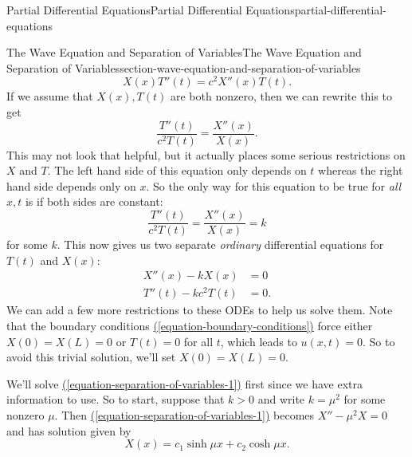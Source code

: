 \documentclass[oneside,10pt,]{book}
\numberwithin{equation}{section}
\newcommand{\amp}{&}
\begin{document}
\begin{chapterptx}{Partial Differential Equations}{}{Partial Differential Equations}{}{}{partial-differential-equations}
\begin{sectionptx}{The Wave Equation and Separation of Variables}{}{The Wave Equation and Separation of Variables}{}{}{section-wave-equation-and-separation-of-variables}
%
\begin{equation*}
X(x)T''(t) = c^{2}X''(x)T(t).
\end{equation*}
\hypertarget{p-654}{}%
If we assume that \(X(x),T(t)\) are both nonzero, then we can rewrite this to get%
\begin{equation*}
\frac{T''(t)}{c^{2}T(t)} = \frac{X''(x)}{X(x)}.
\end{equation*}
This may not look that helpful, but it actually places some serious restrictions on \(X\) and \(T\). The left hand side of this equation only depends on \(t\) whereas the right hand side depends only on \(x\). So the only way for this equation to be true for \emph{all} \(x,t\) is if both sides are constant:%
\begin{equation*}
\frac{T''(t)}{c^{2}T(t)} = \frac{X''(x)}{X(x)} = k
\end{equation*}
for some \(k\). This now gives us two separate \emph{ordinary} differential equations for \(T(t)\) and \(X(x)\):%
%
\begin{align}
X''(x) - kX(x) \amp = 0 \label{equation-separation-of-variables-1}\\
T''(t) - kc^{2}T(t) \amp = 0\text{.}\label{equation-separation-of-variables-2}
\end{align}
\hypertarget{p-655}{}%
We can add a few more restrictions to these ODEs to help us solve them. Note that the boundary conditions \hyperref[equation-boundary-conditions]{(\ref{equation-boundary-conditions})} force either \(X(0) = X(L) = 0\) or \(T(t) = 0\) for all \(t\), which leads to \(u(x,t) = 0\). So to avoid this trivial solution, we'll set \(X(0) = X(L) = 0\).%
\par
\hypertarget{p-656}{}%
We'll solve \hyperref[equation-separation-of-variables-1]{(\ref{equation-separation-of-variables-1})} first since we have extra information to use. So to start, suppose that \(k>0\) and write \(k = \mu^{2}\) for some nonzero \(\mu\). Then \hyperref[equation-separation-of-variables-1]{(\ref{equation-separation-of-variables-1})} becomes \(X''-\mu^{2}X = 0\) and has solution given by%
\begin{equation*}
X(x) = c_{1}\sinh\mu x + c_{2}\cosh \mu x.
\end{equation*}
%
\par
\hypertarget{p-657}{}%

\end{sectionptx}
\end{chapterptx}
\end{document}
